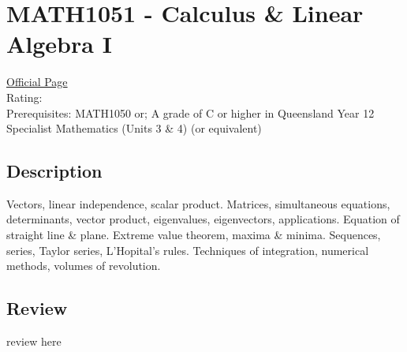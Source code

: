 \hypertarget{MATH1051}{\section{MATH1051 - Calculus \& Linear Algebra I}}

\large
\textcolor{turbo_purple}{\href{https://my.uq.edu.au/programs-courses/course.html?course_code=MATH1051}{Official Page}} \\
Rating: \cstar\cstar\cstar\cstar\ostar \\
Prerequisites: MATH1050 or;
A grade of C or higher in Queensland Year 12 Specialist Mathematics (Units 3 \& 4) (or equivalent)

\normalsize
\subsection*{Description}
Vectors, linear independence, scalar product.
Matrices, simultaneous equations, determinants, vector product, eigenvalues, eigenvectors, applications.
Equation of straight line \& plane.
Extreme value theorem, maxima \& minima.
Sequences, series, Taylor series, L'Hopital's rules.
Techniques of integration, numerical methods, volumes of revolution.

\subsection*{Review}
review here
